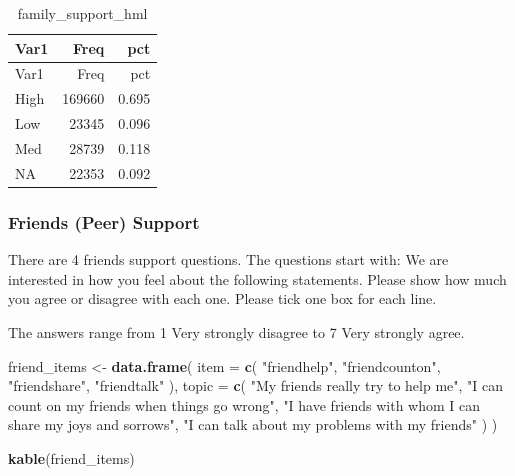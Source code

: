 \documentclass[
]{article}
\newenvironment{Shaded}{\begin{snugshade}}{\end{snugshade}}
\newcommand{\AttributeTok}[1]{\textcolor[rgb]{0.13,0.29,0.53}{#1}}
\newcommand{\FunctionTok}[1]{\textcolor[rgb]{0.13,0.29,0.53}{\textbf{#1}}}
\newcommand{\NormalTok}[1]{#1}
\newcommand{\OtherTok}[1]{\textcolor[rgb]{0.56,0.35,0.01}{#1}}
\newcommand{\StringTok}[1]{\textcolor[rgb]{0.31,0.60,0.02}{#1}}
\begin{document}
\begin{longtable}[]{@{}lrr@{}}
\caption{family\_support\_hml}\tabularnewline
\toprule\noalign{}
Var1 & Freq & pct \\
\midrule\noalign{}
\endfirsthead
\toprule\noalign{}
Var1 & Freq & pct \\
\midrule\noalign{}
\endhead
\bottomrule\noalign{}
\endlastfoot
High & 169660 & 0.695 \\
Low & 23345 & 0.096 \\
Med & 28739 & 0.118 \\
NA & 22353 & 0.092 \\
\end{longtable}

\subsubsection{Friends (Peer) Support}\label{friends-peer-support}

There are 4 friends support questions. The questions start with: We are
interested in how you feel about the following statements. Please show
how much you agree or disagree with each one. Please tick one box for
each line.

The answers range from 1 Very strongly disagree to 7 Very strongly
agree.

\begin{Shaded}
\begin{Highlighting}[]
\NormalTok{friend\_items }\OtherTok{\textless{}{-}} \FunctionTok{data.frame}\NormalTok{(}
  \AttributeTok{item =} \FunctionTok{c}\NormalTok{(}
    \StringTok{"friendhelp"}\NormalTok{,}
    \StringTok{"friendcounton"}\NormalTok{,}
    \StringTok{"friendshare"}\NormalTok{,}
    \StringTok{"friendtalk"}
\NormalTok{  ),}
  \AttributeTok{topic =} \FunctionTok{c}\NormalTok{(}
    \StringTok{"My friends really try to help me"}\NormalTok{,}
    \StringTok{"I can count on my friends when things go wrong"}\NormalTok{,}
    \StringTok{"I have friends with whom I can share my joys and sorrows"}\NormalTok{,}
    \StringTok{"I can talk about my problems with my friends"}
\NormalTok{  )}
\NormalTok{)}

\FunctionTok{kable}\NormalTok{(friend\_items)}
\end{Highlighting}
\end{Shaded}
\end{document}
